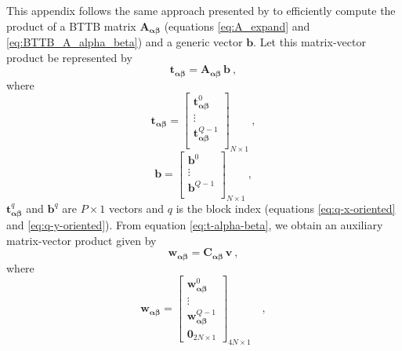 
This appendix follows the same approach presented by \citet{takahashi2020convolutional}
to efficiently compute the product of a BTTB matrix
$\mathbf{A_{\boldsymbol{\alpha\beta}}}$ (equations \ref{eq:A_expand} and \ref{eq:BTTB_A_alpha_beta}) 
and a generic vector $\mathbf{b}$. Let this matrix-vector product be represented by
\begin{equation}
\mathbf{t}_{\boldsymbol{\alpha\beta}} = 
\mathbf{A_{\boldsymbol{\alpha\beta}}} \, \mathbf{b} \: ,
\label{eq:t-alpha-beta}
\end{equation}
where
\begin{equation}
\mathbf{t}_{\boldsymbol{\alpha\beta}} = \begin{bmatrix}
\mathbf{t}^{0}_{\boldsymbol{\alpha\beta}} \\
\vdots \\
\mathbf{t}^{Q-1}_{\boldsymbol{\alpha\beta}} \\
\end{bmatrix}_{N \times 1} \: ,
\label{eq:t-alpha-beta-partitioned}
\end{equation} 
\begin{equation}
\mathbf{b} = \begin{bmatrix}
\mathbf{b}^{0} \\
\vdots \\
\mathbf{b}^{Q-1} \\
\end{bmatrix}_{N \times 1} \: ,
\label{eq:b-partitioned}
\end{equation}
$\mathbf{t}^{q}_{\boldsymbol{\alpha\beta}}$ and $\mathbf{b}^{q}$ are $P \times 1$ vectors 
and $q$ is the block index (equations \ref{eq:q-x-oriented} and \ref{eq:q-y-oriented}). 
From equation \ref{eq:t-alpha-beta}, we obtain an auxiliary matrix-vector product given by
\begin{equation}
\mathbf{w}_{\boldsymbol{\alpha\beta}} = \mathbf{C}_{\boldsymbol{\alpha\beta}} \, \mathbf{v} \: ,
\label{eq:w_alpha_beta}
\end{equation}
where
\begin{equation}
\mathbf{w}_{\boldsymbol{\alpha\beta}} = \begin{bmatrix}
\mathbf{w}_{\boldsymbol{\alpha\beta}}^{0} \\
\vdots \\
\mathbf{w}_{\boldsymbol{\alpha\beta}}^{Q - 1} \\
\mathbf{0}_{2N \times 1}
\end{bmatrix}_{4N \times 1} \quad ,
\label{eq:w_alpha_beta_partitioned}
\end{equation}

